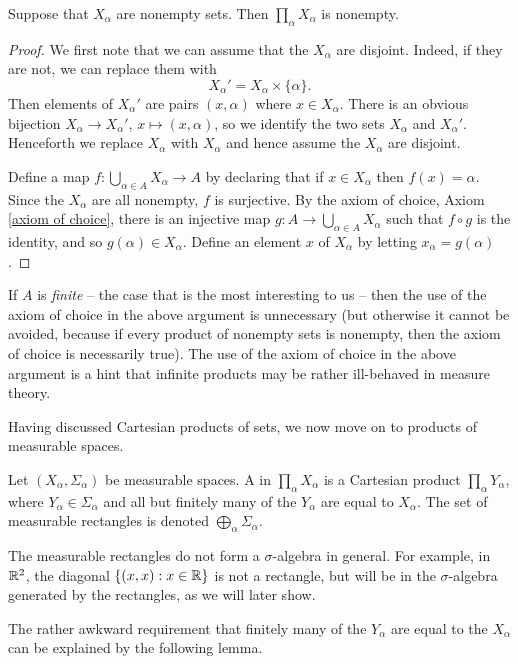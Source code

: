 \begin{lemma}
Suppose that $X_\alpha$ are nonempty sets. Then $\prod_\alpha X_\alpha$ is nonempty.
\end{lemma}
\begin{proof}
We first note that we can assume that the $X_\alpha$ are disjoint. Indeed, if they are not, we can replace them with
$$X_\alpha' = X_\alpha \times \{\alpha\}.$$
Then elements of $X_\alpha'$ are pairs $(x, \alpha)$ where $x \in X_\alpha$.
There is an obvious bijection $X_\alpha \to X_\alpha'$, $x \mapsto (x, \alpha)$, so we identify the two sets $X_\alpha$ and $X_\alpha'$.
Henceforth we replace $X_\alpha$ with $X_\alpha$ and hence assume the $X_\alpha$ are disjoint.

Define a map $f: \bigcup_{\alpha \in A} X_\alpha \to A$ by declaring that if $x \in X_\alpha$ then $f(x) = \alpha$.
Since the $X_\alpha$ are all nonempty, $f$ is surjective.
By the axiom of choice, Axiom \ref{axiom of choice}, there is an injective map $g: A \to \bigcup_{\alpha \in A} X_\alpha$ such that $f \circ g$ is the identity, and so $g(\alpha) \in X_\alpha$.
Define an element $x$ of $X_\alpha$ by letting $x_\alpha = g(\alpha)$.
\end{proof}
If $A$ is \emph{finite} -- the case that is the most interesting to us -- then the use of the axiom of choice in the above argument is unnecessary (but otherwise it cannot be avoided, because if every product of nonempty sets is nonempty, then the axiom of choice is necessarily true).
The use of the axiom of choice in the above argument is a hint that infinite products may be rather ill-behaved in measure theory.

Having discussed Cartesian products of sets, we now move on to products of measurable spaces.
\begin{definition}
Let $(X_\alpha, \Sigma_\alpha)$ be measurable spaces.
A  in $\prod_\alpha X_\alpha$ is a Cartesian product $\prod_\alpha Y_\alpha$, where $Y_\alpha \in \Sigma_\alpha$ and all but finitely many of the $Y_\alpha$ are equal to $X_\alpha$.
The set of measurable rectangles is denoted $\bigoplus_\alpha \Sigma_\alpha$.
\end{definition}

The measurable rectangles do not form a $\sigma$-algebra in general.
For example, in $\mathbb{R}^2$, the diagonal $\{(x, x): x \in \mathbb{R}\}$ is not a rectangle, but will be in the $\sigma$-algebra generated by the rectangles, as we will later show.

The rather awkward requirement that finitely many of the $Y_\alpha$ are equal to the $X_\alpha$ can be explained by the following lemma.

